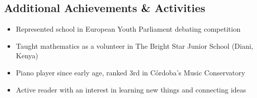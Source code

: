 \documentclass[11pt,a4paper]{article}
\begin{document}
\subsection{Additional Achievements \& Activities}
\begin{itemize}
    \item Represented school in European Youth Parliament debating competition
    \item Taught mathematics as a volunteer in The Bright Star Junior School (Diani, Kenya)
    \item Piano player since early age, ranked 3rd in Córdoba's Music Conservatory
    \item Active reader with an interest in learning new things and connecting ideas
\end{itemize}
\end{document}
